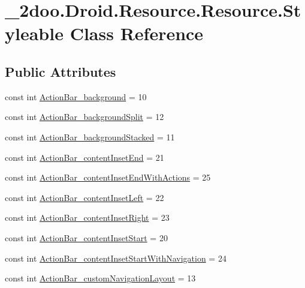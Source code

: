 \hypertarget{class__2doo_1_1_droid_1_1_resource_1_1_styleable}{
\section{\_\-2doo.Droid.Resource.Resource.Styleable Class Reference}
\label{class__2doo_1_1_droid_1_1_resource_1_1_styleable}
}
\subsection*{Public Attributes}
\begin{CompactItemize}
\item 
const int \hyperlink{class__2doo_1_1_droid_1_1_resource_1_1_styleable_dbf6d90ed3ed1fa65340217887a05ce0}{ActionBar\_\-background} = 10
\item 
const int \hyperlink{class__2doo_1_1_droid_1_1_resource_1_1_styleable_7d76265b46e3d0e7e411b5770a525d36}{ActionBar\_\-backgroundSplit} = 12
\item 
const int \hyperlink{class__2doo_1_1_droid_1_1_resource_1_1_styleable_5464e800fcc1adf516c39e5922fdb581}{ActionBar\_\-backgroundStacked} = 11
\item 
const int \hyperlink{class__2doo_1_1_droid_1_1_resource_1_1_styleable_a4b60e7b450f8d356b1e6de34078cc37}{ActionBar\_\-contentInsetEnd} = 21
\item 
const int \hyperlink{class__2doo_1_1_droid_1_1_resource_1_1_styleable_8c1b56fef9bb0ab7ebbd322850d1a5ef}{ActionBar\_\-contentInsetEndWithActions} = 25
\item 
const int \hyperlink{class__2doo_1_1_droid_1_1_resource_1_1_styleable_daab29f627158fd2740f1addcb366395}{ActionBar\_\-contentInsetLeft} = 22
\item 
const int \hyperlink{class__2doo_1_1_droid_1_1_resource_1_1_styleable_f0bad14cac25086dd85488e5c59a014a}{ActionBar\_\-contentInsetRight} = 23
\item 
const int \hyperlink{class__2doo_1_1_droid_1_1_resource_1_1_styleable_d6324a7f5087a46ae0c96e850358c057}{ActionBar\_\-contentInsetStart} = 20
\item 
const int \hyperlink{class__2doo_1_1_droid_1_1_resource_1_1_styleable_d50708f9e8e94052d9a01339586c191d}{ActionBar\_\-contentInsetStartWithNavigation} = 24
\item 
const int \hyperlink{class__2doo_1_1_droid_1_1_resource_1_1_styleable_5e44c493f7d94950a78c4535801f4832}{ActionBar\_\-customNavigationLayout} = 13
\item 

\end{CompactItemize}
